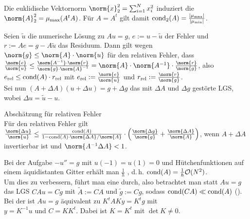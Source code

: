 \begin{Bem}
    Die euklidische Vektornorm
    $\norm{x}_2^2 = \sum_{i=1}^N x_i^2$ induziert die
    \\
    $\norm{A}_2^2 = \mu_{\max}(A^t A)$.
    Für $A = A^t$ gilt damit $\operatorname{cond}_2(A) = \frac{|\mu_{\max}|}{|\mu_{\min}|}$.
\end{Bem}

\linie

\begin{Bem}
    Seien $\widetilde{u}$ die numerische Lösung zu $Au = g$,
    $e := u - \widetilde{u}$ der Fehler und\\
    $r := Ae = g - A\widetilde{u}$ das Residuum.
    Dann gilt wegen $\norm{g} \le \norm{A} \cdot \norm{u}$
    für den relativen Fehler, dass
    $\frac{\norm{e}}{\norm{u}} \le
    \frac{\norm{A^{-1}} \cdot \norm{r}}{\norm{g} \cdot \norm{A}^{-1}} =
    \norm{A} \cdot \norm{A^{-1}} \cdot \frac{\norm{r}}{\norm{g}}$,
    also $e_{{\text{rel}}} \le \operatorname{cond}(A) \cdot r_{{\text{rel}}}$ mit
    $e_\rel := \frac{\norm{e}}{\norm{u}}$ und
    $r_\rel := \frac{\norm{r}}{\norm{g}}$.\\
    Sei nun $(A + \Delta A) (u + \Delta u) = g + \Delta g$ das mit
    $\Delta A$ und $\Delta g$ gestörte LGS,
    wobei $\Delta u = \widetilde{u} - u$.
\end{Bem}

\begin{Satz}{Abschätzung für relativen Fehler}\\
    Für den relativen Fehler gilt
    $\frac{\norm{\Delta u}}{\norm{u}} \le \frac{\cond(A)}
    {1 - \cond(A) \cdot \norm{\Delta A}/\norm{A}} \cdot
    \left(\frac{\norm{\Delta g}}{\norm{g}} +
    \frac{\norm{\Delta A}}{\norm{A}}\right)$,
    wenn $A + \Delta A$ invertierbar ist und
    $\norm{A^{-1} \Delta A} < 1$.
\end{Satz}

\linie

\begin{Bsp}
    Bei der Aufgabe $-u'' = g$ mit
    $u(-1) = u(1) = 0$ und Hütchenfunktionen auf einem
    äquidistanten Gitter erhält man
    $\frac{1}{h}$ ,
    d.\,h. $\operatorname{cond}(A) = \frac{1}{h} \mathcal{O}(N^2)$.\\
    Um dies zu verbessern, führt man eine  durch,
    also betrachtet man statt $Au = g$ das LGS $CAu = Cg$ mit
    $\widetilde{A} := CA$ und $\widetilde{g} := Cg$, sodass
    $\operatorname{cond}(CA) \ll \operatorname{cond}(A)$
    ().\\
    Bei der  ist
    $Au = g$ äquivalent zu $K^t A K y = K^t g$ mit\\
    $y = K^{-1} u$ und $C = K K^t$.
    Dabei ist $K = K^t$ mit $\det K \not= 0$.
\end{Bsp}

